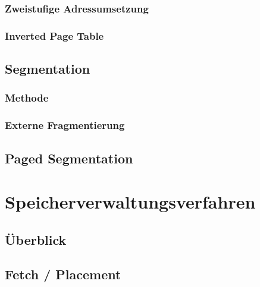\subsubsection{Zweistufige Adressumsetzung}

\subsubsection{Inverted Page Table}
\subsection{Segmentation}
\subsubsection{Methode}
\subsubsection{Externe Fragmentierung}

\subsection{Paged Segmentation}

\section{Speicherverwaltungsverfahren}
\subsection{Überblick}
\subsection{Fetch / Placement}

